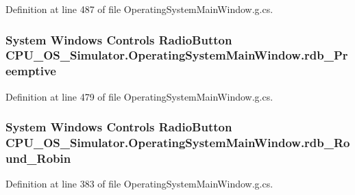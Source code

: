 Definition at line 487 of file Operating\+System\+Main\+Window.\+g.\+cs.

\hypertarget{class_c_p_u___o_s___simulator_1_1_operating_system_main_window_a1bdd1425ce8e8dba8ea5906e787aa9b1}{}
\subsubsection[{rdb\+\_\+\+Preemptive}]{\setlength{\rightskip}{0pt plus 5cm}System Windows Controls Radio\+Button C\+P\+U\+\_\+\+O\+S\+\_\+\+Simulator.\+Operating\+System\+Main\+Window.\+rdb\+\_\+\+Preemptive\hspace{0.3cm}{\ttfamily [package]}}\label{class_c_p_u___o_s___simulator_1_1_operating_system_main_window_a1bdd1425ce8e8dba8ea5906e787aa9b1}


Definition at line 479 of file Operating\+System\+Main\+Window.\+g.\+cs.

\hypertarget{class_c_p_u___o_s___simulator_1_1_operating_system_main_window_a5be51435049a03c98c57e035eff181ec}{}
\subsubsection[{rdb\+\_\+\+Round\+\_\+\+Robin}]{\setlength{\rightskip}{0pt plus 5cm}System Windows Controls Radio\+Button C\+P\+U\+\_\+\+O\+S\+\_\+\+Simulator.\+Operating\+System\+Main\+Window.\+rdb\+\_\+\+Round\+\_\+\+Robin\hspace{0.3cm}{\ttfamily [package]}}\label{class_c_p_u___o_s___simulator_1_1_operating_system_main_window_a5be51435049a03c98c57e035eff181ec}


Definition at line 383 of file Operating\+System\+Main\+Window.\+g.\+cs.

